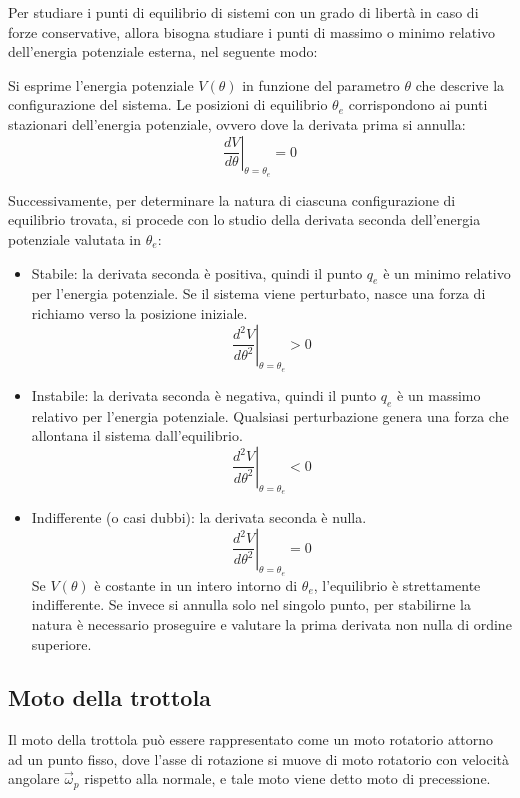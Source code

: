 \documentclass[11pt, a4paper, openright]{book}
\theoremstyle{plain}
\theoremstyle{definition}
\begin{document}
Per studiare i punti di equilibrio di sistemi con un grado di libertà in caso di forze conservative, allora bisogna studiare i punti di massimo o minimo relativo dell'energia potenziale esterna, nel seguente modo:

Si esprime l'energia potenziale $V(\theta)$ in funzione del parametro $\theta$ che descrive la configurazione del sistema. Le posizioni di equilibrio $\theta_e$ corrispondono ai punti stazionari dell'energia potenziale, ovvero dove la derivata prima si annulla:
\begin{equation}
    \left. \frac{dV}{d\theta} \right|_{\theta=\theta_e} = 0
\end{equation}

Successivamente, per determinare la natura di ciascuna configurazione di equilibrio trovata, si procede con lo studio della derivata seconda dell'energia potenziale valutata in $\theta_e$:
\begin{itemize}
    \item Stabile: la derivata seconda è positiva, quindi il punto $q_e$ è un minimo relativo per l'energia potenziale. Se il sistema viene perturbato, nasce una forza di richiamo verso la posizione iniziale.
    \begin{equation}
        \left. \frac{d^2V}{d\theta^2} \right|_{\theta=\theta_e} > 0
    \end{equation}
    
    \item Instabile: la derivata seconda è negativa, quindi il punto $q_e$ è un massimo relativo per l'energia potenziale. Qualsiasi perturbazione genera una forza che allontana il sistema dall'equilibrio.
    \begin{equation}
        \left. \frac{d^2V}{d\theta^2} \right|_{\theta=\theta_e} < 0
    \end{equation}
    
    \item Indifferente (o casi dubbi): la derivata seconda è nulla. 
    \begin{equation}
        \left. \frac{d^2V}{d\theta^2} \right|_{\theta=\theta_e} = 0
    \end{equation}
    Se $V(\theta)$ è costante in un intero intorno di $\theta_e$, l'equilibrio è strettamente indifferente. Se invece si annulla solo nel singolo punto, per stabilirne la natura è necessario proseguire e valutare la prima derivata non nulla di ordine superiore.
\end{itemize}

\subsection{Moto della trottola}
Il moto della trottola può essere rappresentato come un moto rotatorio attorno ad un punto fisso, dove l'asse di rotazione si muove di moto rotatorio con velocità angolare $\vec{\omega}_p$ rispetto alla normale, e tale moto viene detto moto di precessione.
\end{document}
